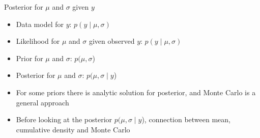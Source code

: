 \documentclass[finnish,english,t]{beamer}
\begin{document}

\begin{frame}{Posterior for $\mu$ and $\sigma$ given $y$}

  \begin{itemize}
  \item<+-> Data model for $y$: $p(y \mid \mu, \sigma)$
  \item<+-> Likelihood for $\mu$ and $\sigma$ given observed $y$: $p(y \mid \mu, \sigma)$
  \item<+-> Prior for $\mu$ and $\sigma$: $p(\mu, \sigma$)
  \item<+-> Posterior for $\mu$ and $\sigma$: $p(\mu, \sigma \mid y $)
  \item<+-> For some priors there is analytic solution for posterior,
    and Monte Carlo is a general approach
  \item<+-> Before looking at the posterior $p(\mu, \sigma \mid y $),
    connection between mean, cumulative density and Monte Carlo
  \end{itemize}
  
\end{frame}
\end{document}
